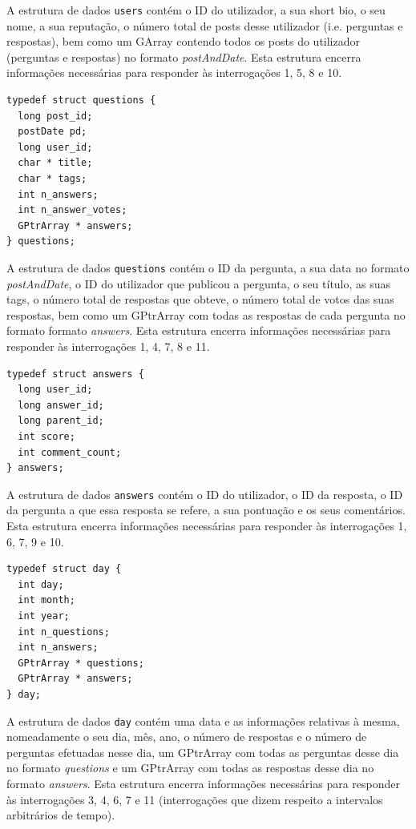 \documentclass[a4paper]{article}
\begin{document}
A estrutura de dados \texttt{users} contém o ID do utilizador, a sua short bio, o seu nome,
a sua reputação, o número total de posts desse utilizador (i.e. perguntas e respostas),
bem como um GArray contendo todos os posts do utilizador (perguntas e respostas) no
formato \textit{postAndDate}.
Esta estrutura encerra informações necessárias para responder às interrogações 1,
5, 8 e 10.

\begin{verbatim}
typedef struct questions {
  long post_id;
  postDate pd;
  long user_id;
  char * title;
  char * tags;
  int n_answers;
  int n_answer_votes;
  GPtrArray * answers;
} questions;
\end{verbatim}

A estrutura de dados \texttt{questions} contém o ID da pergunta, a sua data no formato
\textit{postAndDate}, o ID do utilizador que publicou a pergunta, o seu título,
as suas tags, o número total de
respostas que obteve, o número total de votos das suas respostas,
bem como um GPtrArray com todas as respostas de cada
pergunta no formato formato \textit{answers}.
Esta estrutura encerra informações necessárias para responder às interrogações 1,
4, 7, 8 e 11.

\begin{verbatim}
typedef struct answers {
  long user_id;
  long answer_id;
  long parent_id;
  int score;
  int comment_count;
} answers;
\end{verbatim}

A estrutura de dados \texttt{answers} contém o ID do utilizador, o ID da resposta, o ID da
pergunta a que essa resposta se refere, a sua pontuação e os seus comentários.
Esta estrutura encerra informações necessárias para responder às interrogações 1,
6, 7, 9 e 10.

\begin{verbatim}
typedef struct day {
  int day;
  int month;
  int year;
  int n_questions;
  int n_answers;
  GPtrArray * questions;
  GPtrArray * answers;
} day;
\end{verbatim}

A estrutura de dados \texttt{day} contém uma data e as informações relativas à mesma,
nomeadamente o seu dia, mês, ano, o número de respostas e o
número de perguntas efetuadas nesse dia, um GPtrArray com todas as perguntas
desse dia no formato \textit{questions} e um GPtrArray com todas as respostas
desse dia no formato \textit{answers}. Esta estrutura encerra informações
necessárias para responder às interrogações 3, 4, 6, 7 e 11
(interrogações que dizem respeito a intervalos arbitrários de tempo).
\end{document}
